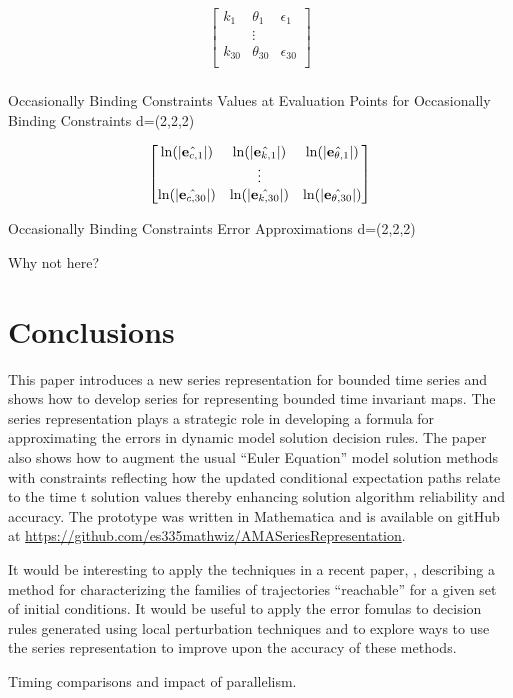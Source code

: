 \documentclass[12pt]{article}
\begin{document}
\begin{table}
  \centering
  
\begin{gather*}
  \begin{bmatrix}
    k_1&\theta_1&\epsilon_1\\
&\vdots\\
    k_{30}&\theta_{30}&\epsilon_{30}\\
  \end{bmatrix}\\
% 
\end{gather*}

  \caption{Occasionally Binding Constraints Values at Evaluation Points for Occasionally Binding Constraints \label{valatobcB}  d=(2,2,2)}
\end{table}


 \begin{table}
   \centering

   \begin{gather*}
\forEstErr\\
%   
   \end{gather*}
   \caption{Occasionally Binding Constraints Error Approximations\label{esterrobcB}  d=(2,2,2)}
 \end{table}

Why not here?



\clearpage
\section{Conclusions}
This paper introduces a new series representation for bounded time series and
shows how to develop  series for representing bounded time invariant maps.
The series representation plays a strategic role in developing a formula 
for approximating the errors in dynamic model solution decision rules. 
 The paper
also shows how to  augment the usual ``Euler Equation'' model solution
methods with constraints reflecting how the updated
conditional expectation paths relate to the time t solution values thereby
enhancing solution algorithm reliability and accuracy.
The prototype was written in Mathematica and is available on gitHub
at \href{https://github.com/es335mathwiz/AMASeriesRepresentation}{https://github.com/es335mathwiz/AMASeriesRepresentation}.

{\color{blue}
It would be interesting to apply the techniques in a recent paper, \citep{DreossiDP16}, describing a method for characterizing the
families of trajectories ``reachable'' for a given set of initial conditions.
It would be useful to apply the error fomulas to decision rules generated
using local perturbation techniques and to explore ways to use the series
representation to improve upon the accuracy of these methods.

Timing comparisons and impact of parallelism.
}
\newpage
\end{document}
